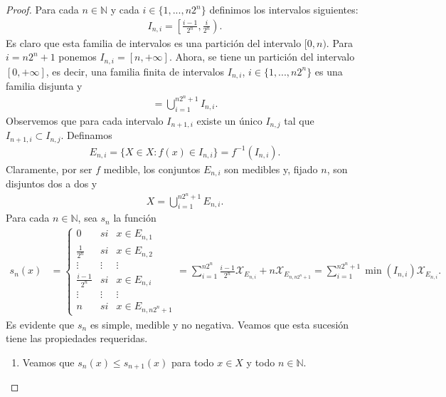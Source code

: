 \begin{proof}
    Para cada $n \in \mathbb{N}$ y cada $i \in \{ 1, ..., n2^n\}$ definimos los intervalos siguientes:
    \begin{align*}
        I_{n,i} = \left[ \frac{i-1}{2^n}, \frac{i}{2^n} \right).
    \end{align*}
    Es claro que esta familia de intervalos es una partición del intervalo $[0,n)$. Para $i = n2^n + 1$ ponemos $I_{n,i} = [n, +\infty]$. Ahora, se tiene un partición del intervalo $[0, +\infty]$, es decir, una familia finita de intervalos $I_{n,i}$, $i \in \{1,...,n2^n \}$ es una familia disjunta y
    \begin{align*}
        [0, +\infty] = \bigcup_{i=1}^{n2^n + 1}{I_{n,i}}.
    \end{align*}
    Observemos que para cada intervalo $I_{n+1,i}$ existe un único $I_{n,j}$ tal que $I_{n+1,i} \subset I_{n,j}$. Definamos
    \begin{align*}
        E_{n,i} = \{ X \in X : f(x) \in I_{n,i} \} = f^{-1}(I_{n,i}).
    \end{align*}
    Claramente, por ser $f$ medible, los conjuntos $E_{n,i}$ son medibles y, fijado $n$, son disjuntos dos a dos y
    \begin{align*}
        X = \bigcup_{i=1}^{n2^n +1}{E_{n,i}}.
    \end{align*}
    Para cada $n \in \mathbb{N}$, sea $s_n$ la función
    \begin{align*}
        s_n(x) & = \left\{ \begin{array}{lcc}
                               0               & si     & x \in E_{n,1}      \\
                               \frac{1}{2^n}   & si     & x \in E_{n,2}      \\
                               \vdots          & \vdots & \vdots             \\
                               \frac{i-1}{2^n} & si     & x \in E_{n,i}      \\
                               \vdots          & \vdots & \vdots             \\
                               n               & si     & x \in E_{n,n2^n+1}
                           \end{array}
        \right.
        = \sum_{i=1}^{n2^n}{\frac{i-1}{2^n}\mathcal{X}_{E_{n,i}}} + n\mathcal{X}_{E_{n,n2^n+1}} = \sum_{i=1}^{n2^n +1}{\min(I_{n,i})\mathcal{X}_{E_{n,i}}}.
    \end{align*}
    Es evidente que $s_n$ es simple, medible y no negativa. Veamos que esta sucesión tiene las propiedades requeridas.
    \begin{enumerate}
        \item Veamos que $s_n(x) \leq s_{n+1}(x)$ para todo $x \in X$ y todo $n \in \mathbb{N}$.


\end{enumerate}
\end{proof}
